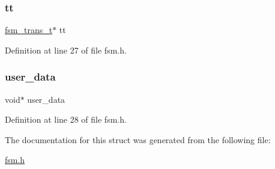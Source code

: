 \subsubsection{\texorpdfstring{tt}{tt}}
{\footnotesize\ttfamily \mbox{\hyperlink{fsm_8h_a6b1de28e7a9f91913bb0499e2584b5ac}{fsm\+\_\+trans\+\_\+t}}$\ast$ tt}



Definition at line 27 of file fsm.\+h.

\mbox{\label{structfsm___a0f53d287ac7c064d1a49d4bd93ca1cb9}} 
\subsubsection{\texorpdfstring{user\+\_\+data}{user\_data}}
{\footnotesize\ttfamily void$\ast$ user\+\_\+data}



Definition at line 28 of file fsm.\+h.



The documentation for this struct was generated from the following file\+:\begin{DoxyCompactItemize}
\item 
\mbox{\hyperlink{fsm_8h}{fsm.\+h}}\end{DoxyCompactItemize}
